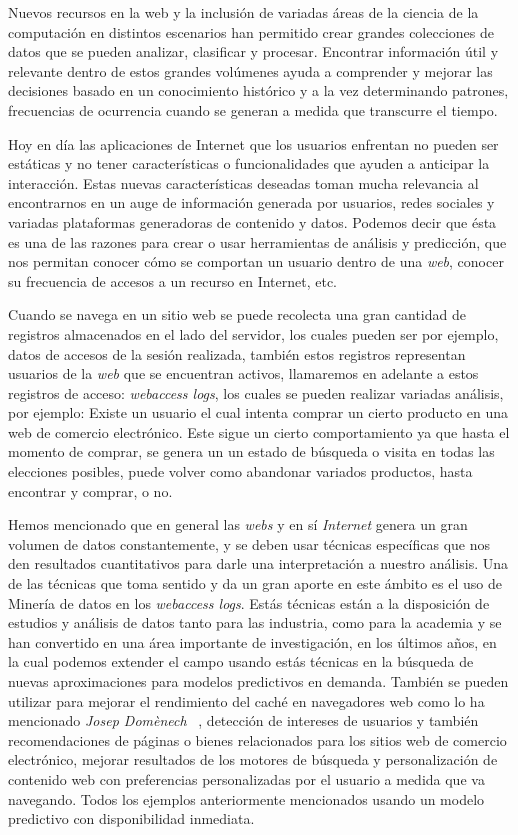 {
	
Nuevos recursos en la web y la inclusión de variadas áreas de la ciencia de la computación	en distintos escenarios han permitido crear grandes colecciones de datos que se pueden analizar, clasificar y procesar. Encontrar información útil y relevante dentro de estos grandes volúmenes ayuda a comprender y mejorar las decisiones basado en un conocimiento histórico  y a la vez determinando patrones, frecuencias de ocurrencia cuando se generan a medida que transcurre el tiempo. 


Hoy en día las aplicaciones de Internet que los usuarios enfrentan no pueden ser estáticas y no tener características o funcionalidades que ayuden a anticipar la interacción. Estas nuevas características deseadas toman mucha relevancia al encontrarnos en un auge de información generada por usuarios, redes sociales y variadas plataformas generadoras de contenido y datos. Podemos decir que ésta es una de las razones para  crear o usar  herramientas de análisis y predicción, que nos permitan conocer cómo se comportan un usuario  dentro de una \emph{web}, conocer su frecuencia de accesos a un recurso en Internet, etc.

Cuando se navega en un sitio web se puede recolecta una gran cantidad de registros almacenados en el lado del servidor, los cuales pueden ser por ejemplo, datos de accesos de la sesión realizada, también estos  registros representan usuarios de la \emph{web}  que se encuentran activos, llamaremos en adelante a estos registros de acceso: \emph{webaccess logs},   los cuales se pueden realizar variadas análisis, por ejemplo:  Existe un usuario el cual intenta comprar un cierto producto en una web de comercio electrónico. Este sigue un cierto comportamiento ya que hasta el momento de comprar, se genera un un estado de búsqueda o visita en todas las elecciones posibles, puede volver como abandonar variados productos, hasta encontrar y comprar, o no. 

Hemos mencionado  que  en general las \emph{webs}  y en sí \emph{Internet} genera un gran volumen de datos constantemente, y se deben usar técnicas específicas que nos den resultados cuantitativos para darle una interpretación a nuestro análisis. Una de las técnicas que toma sentido y da un gran aporte en este ámbito es el uso de Minería de datos  en los \emph{webaccess logs}.  Estás técnicas están a la disposición  de estudios y análisis de datos tanto para las industria, como para la academia y  se han convertido en una área importante  de investigación, en los últimos años, en la cual podemos extender el campo usando estás técnicas en la búsqueda de nuevas aproximaciones para modelos predictivos en demanda. También se pueden utilizar para mejorar el rendimiento del caché en navegadores web como lo ha mencionado \emph{Josep Domènech} \etal~\cite{Domenech2006},  detección de intereses de usuarios y también recomendaciones de páginas o bienes relacionados para los sitios {web} de comercio electrónico, mejorar  resultados de los motores de búsqueda y personalización de contenido web con preferencias personalizadas por el usuario a medida que va navegando. Todos los ejemplos anteriormente mencionados usando un modelo predictivo con disponibilidad inmediata.



}
